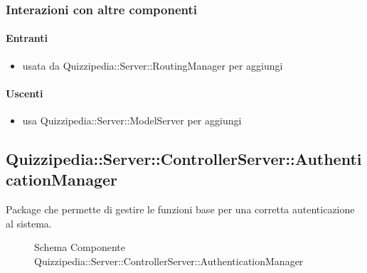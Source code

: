 \subsubsection{Interazioni con altre componenti}
\paragraph{Entranti}
\begin{itemize}
\item usata da Quizzipedia::Server::RoutingManager per aggiungi
\end{itemize}
\paragraph{Uscenti}
\begin{itemize}
\item usa Quizzipedia::Server::ModelServer per aggiungi
\end{itemize}
\subsection{Quizzipedia::Server::ControllerServer::AuthenticationManager}
Package che permette di gestire le funzioni base per una corretta autenticazione al sistema.
\begin{figure}[H]
\centering
\noindent{}
\caption[Schema Componente Quizzipedia::Server::ControllerServer::AuthenticationManager]{Schema Componente Quizzipedia::Server::ControllerServer::AuthenticationManager}
\end{figure}
